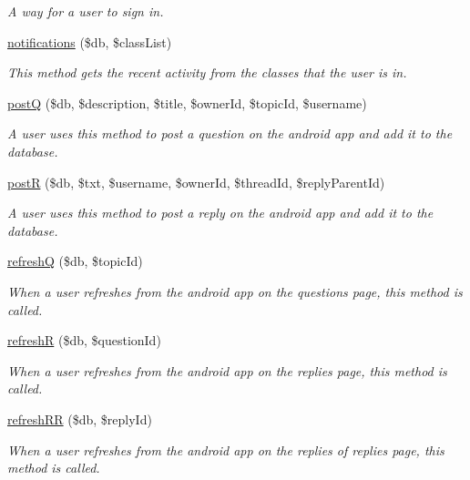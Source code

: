 \begin{DoxyCompactItemize}
\begin{DoxyCompactList}\small\item\em A way for a user to sign in. \end{DoxyCompactList}\item 
\mbox{\hyperlink{androidApi_8php_a4c05b7d933640256ef589c2673e3632f}{notifications}} (\$db, \$class\+List)
\begin{DoxyCompactList}\small\item\em This method gets the recent activity from the classes that the user is in. \end{DoxyCompactList}\item 
\mbox{\hyperlink{androidApi_8php_a7a8194523f1737cb393a1291d9323cac}{postQ}} (\$db, \$description, \$title, \$owner\+Id, \$topic\+Id, \$username)
\begin{DoxyCompactList}\small\item\em A user uses this method to post a question on the android app and add it to the database. \end{DoxyCompactList}\item 
\mbox{\hyperlink{androidApi_8php_a33bbb40bff081bbfae6af39138695efd}{postR}} (\$db, \$txt, \$username, \$owner\+Id, \$thread\+Id, \$reply\+Parent\+Id)
\begin{DoxyCompactList}\small\item\em A user uses this method to post a reply on the android app and add it to the database. \end{DoxyCompactList}\item 
\mbox{\hyperlink{androidApi_8php_ace28a3a9ee6a9700d657b6a24405c19d}{refreshQ}} (\$db, \$topic\+Id)
\begin{DoxyCompactList}\small\item\em When a user refreshes from the android app on the questions page, this method is called. \end{DoxyCompactList}\item 
\mbox{\hyperlink{androidApi_8php_a9f07a32e2c6fd847ce3fca5979c93996}{refreshR}} (\$db, \$question\+Id)
\begin{DoxyCompactList}\small\item\em When a user refreshes from the android app on the replies page, this method is called. \end{DoxyCompactList}\item 
\mbox{\hyperlink{androidApi_8php_a74f05898b0ba4d0f3177cdd262df4893}{refresh\+RR}} (\$db, \$reply\+Id)
\begin{DoxyCompactList}\small\item\em When a user refreshes from the android app on the replies of replies page, this method is called. \end{DoxyCompactList}\item 

\end{DoxyCompactItemize}
